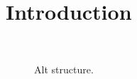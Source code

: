 \documentclass[prb,11pt,tightenlines,twocolumn,aps]{revtex4-1}
\begin{document}
\section{Introduction}
\blindtext
\begin{figure}[ht!]
    \centering
    \label{fig:alt-struc-xz}
    \\
    \label{fig:alt-struc-xy}
    \caption{Alt structure.}
    \label{fig:alt-struc}
\end{figure}
\end{document}
